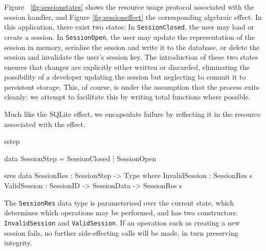 Figure ~\ref{fig:sessionstates} shows the resource usage protocol associated
with the session handler, and Figure \ref{fig:sessioneffect} the corresponding
algebraic effect. In this application, there exist two states:
In \texttt{SessionClosed}, the user may load or create a
session.
In \texttt{SessionOpen}, the user may update the
representation of the session in memory, serialise the session and write it to
the database, or delete the session and invalidate the user's session key. The
introduction of these two states ensures that changes are explicitly either
written or discarded, eliminating the possibility of a developer updating the
session but neglecting to commit it to persistent storage. This, of course, is
under the assumption that the process exits cleanly: we attempt to facilitate
this by writing total functions where possible.

Much like the SQLite effect, we encapsulate failure by reflecting it in the
resource associated with the effect. 

\begin{SaveVerbatim}{sstep}

data SessionStep = SessionClosed | SessionOpen
\end{SaveVerbatim}

\begin{SaveVerbatim}{sres}
data SessionRes : SessionStep -> Type where
  InvalidSession : SessionRes s  
  ValidSession   : SessionID -> 
                   SessionData -> 
                   SessionRes s

\end{SaveVerbatim}




The \texttt{SessionRes} data type is parameterised over the current state,
which determines which operations may be performed, and has two constructors:
\texttt{InvalidSession} and \texttt{ValidSession}. If an operation such as
creating a new session fails, no further side-effecting calls will be made, in
turn preserving integrity. 


